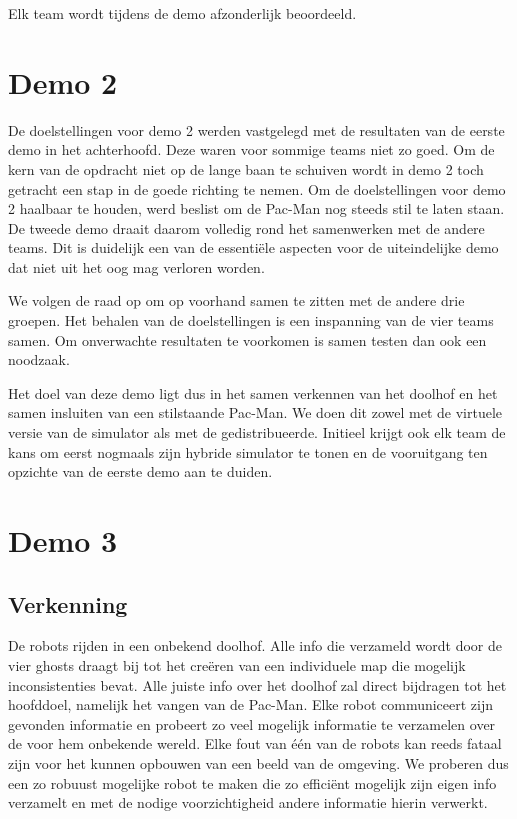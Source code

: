 \documentclass[12pt,a4paper]{report}
\begin{document}
Elk team wordt tijdens de demo afzonderlijk beoordeeld.
 
\section{Demo 2}
 
De doelstellingen voor demo 2 werden vastgelegd met de resultaten van de eerste demo in het achterhoofd. Deze waren voor sommige teams niet zo goed. Om de kern van de opdracht niet op de lange baan te schuiven wordt in demo 2 toch getracht een stap in de goede richting te nemen. Om de doelstellingen voor demo 2 haalbaar te houden, werd beslist om de Pac-Man nog steeds stil te laten staan. De tweede demo draait daarom volledig rond het samenwerken met de andere teams. Dit is duidelijk een van de essenti\"ele aspecten voor de uiteindelijke demo dat niet uit het oog mag verloren worden.

We volgen de raad op om op voorhand samen te zitten met de andere drie groepen. Het behalen van de doelstellingen is een inspanning van de vier teams samen. Om onverwachte resultaten te voorkomen is samen testen dan ook een noodzaak.

Het doel van deze demo ligt dus in het samen verkennen van het doolhof en het samen insluiten van een stilstaande Pac-Man. We doen dit zowel met de virtuele versie van de simulator als met de gedistribueerde. Initieel krijgt ook elk team de kans om eerst nogmaals zijn hybride simulator te tonen en de vooruitgang ten opzichte van de eerste demo aan te duiden.

\section{Demo 3}

\subsection{Verkenning}

De robots rijden in een onbekend doolhof. Alle info die verzameld wordt door de vier ghosts draagt bij tot het cre\"eren van een individuele map die mogelijk inconsistenties bevat. Alle juiste info over het doolhof zal direct bijdragen tot het hoofddoel, namelijk het vangen van de Pac-Man. Elke robot communiceert zijn gevonden informatie en probeert zo veel mogelijk informatie te verzamelen over de voor hem onbekende wereld. Elke fout van \'e\'en van de robots kan reeds fataal zijn voor het kunnen opbouwen van een beeld van de omgeving. We proberen dus een zo robuust mogelijke robot te maken die zo effici\"ent mogelijk zijn eigen info verzamelt en met de nodige voorzichtigheid andere informatie hierin verwerkt.
\end{document}
